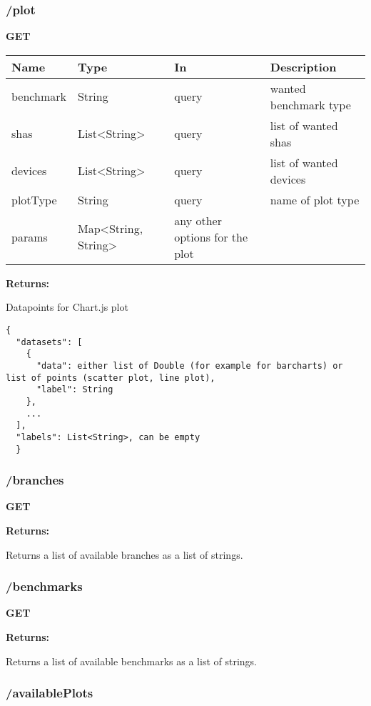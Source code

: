 \subsubsection*{/plot}

\textbf{GET}

\begin{tabular}{ l l l l }
  Name & Type & In & Description \\ 
  \hline
  benchmark & String & query & wanted benchmark type \\
  shas & List<String> & query & list of wanted shas \\
  devices & List<String> & query & list of wanted devices \\
  plotType & String & query & name of plot type \\
  params & Map<String, String> & any other options for the plot \\
  \hline
\end{tabular}

\textbf{Returns: }

Datapoints for Chart.js plot
\begin{lstlisting}
{
  "datasets": [
    {
      "data": either list of Double (for example for barcharts) or list of points (scatter plot, line plot),
      "label": String
    },
    ...
  ],
  "labels": List<String>, can be empty
  }
\end{lstlisting}

\subsubsection*{/branches}

\textbf{GET}

\textbf{Returns: }

Returns a list of available branches as a list of strings.

\subsubsection*{/benchmarks}

\textbf{GET}

\textbf{Returns: }

Returns a list of available benchmarks as a list of strings.

\subsubsection*{/availablePlots}

